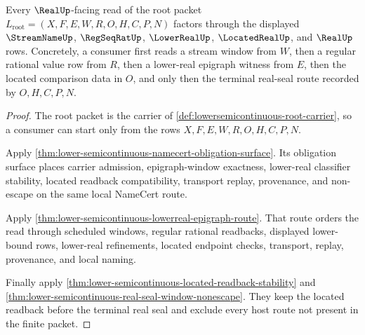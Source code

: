 \begin{theorem}
\label{thm:lowersemicontinuous-real-handoff}
Every $\RealUp$-facing read of the root packet
$L_{\mathrm{root}}=(X,F,E,W,R,O,H,C,P,N)$ factors through the displayed
$\StreamNameUp$, $\RegSeqRatUp$, $\LowerRealUp$, $\LocatedRealUp$, and
$\RealUp$ rows. Concretely, a consumer first reads a stream window from $W$,
then a regular rational value row from $R$, then a lower-real epigraph witness
from $E$, then the located comparison data in $O$, and only then the terminal
real-seal route recorded by $O,H,C,P,N$.
\end{theorem}
\begin{proof}
The root packet is the carrier of
\autoref{def:lowersemicontinuous-root-carrier}, so a consumer can start only
from the rows $X,F,E,W,R,O,H,C,P,N$.

Apply \autoref{thm:lower-semicontinuous-namecert-obligation-surface}. Its
obligation surface places carrier admission, epigraph-window exactness,
lower-real classifier stability, located readback compatibility, transport
replay, provenance, and non-escape on the same local NameCert route.

Apply \autoref{thm:lower-semicontinuous-lowerreal-epigraph-route}. That route
orders the read through scheduled windows, regular rational readbacks,
displayed lower-bound rows, lower-real refinements, located endpoint checks,
transport, replay, provenance, and local naming.

Finally apply
\autoref{thm:lower-semicontinuous-located-readback-stability} and
\autoref{thm:lower-semicontinuous-real-seal-window-nonescape}. They keep the located
readback before the terminal real seal and exclude every host route not present
in the finite packet.
\end{proof}


